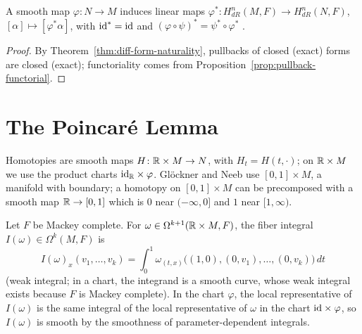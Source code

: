 \begin{proposition}[Functoriality]
  \label{prop:de-rham-functorial}
  \leanok
  A smooth map $\varphi \colon N \to M$ induces linear maps $\varphi^* \colon H^n_{dR}(M, F)
  \to H^n_{dR}(N, F)$, $[\alpha] \mapsto [\varphi^*\alpha]$, with $\mathrm{id}^* = \mathrm{id}$ and
  $(\varphi \circ \psi)^* = \psi^* \circ \varphi^*$ \cite[Section~3.6]{GN26}.
\end{proposition}

\begin{proof}
  \leanok
  By Theorem~\ref{thm:diff-form-naturality}, pullbacks of closed (exact) forms are closed
  (exact); functoriality comes from Proposition~\ref{prop:pullback-functorial}.
\end{proof}

\section{The Poincaré Lemma}

Homotopies are smooth maps $H \colon \mathbb{R} \times M \to N$, with $H_t = H(t, \cdot)$; on $\mathbb{R} \times M$
we use the product charts $\mathrm{id}_{\mathbb{R}} \times \varphi$. Glöckner and Neeb use $[0, 1] \times M$, a
manifold with boundary; a homotopy on $[0, 1] \times M$ can be precomposed with a smooth map
$\mathbb{R} \to [0, 1]$ which is $0$ near $(-\infty, 0]$ and $1$ near $[1, \infty)$.

\begin{definition}
  \label{def:fiber-integral}
  \leanok
  Let $F$ be Mackey complete. For $\omega \in \Omega^{k+1}(\mathbb{R} \times M, F)$, the fiber integral
  $I(\omega) \in \Omega^k(M, F)$ is
  \[
    I(\omega)_x(v_1, \dots, v_k) = \int_0^1 \omega_{(t, x)}\bigl((1, 0), (0, v_1), \dots,
    (0, v_k)\bigr)\, dt
  \]
  (weak integral; in a chart, the integrand is a smooth curve, whose weak integral exists because
  $F$ is Mackey complete). In the chart $\varphi$, the local representative of $I(\omega)$ is the
  same integral of the local representative of $\omega$ in the chart $\mathrm{id} \times \varphi$, so
  $I(\omega)$ is smooth by the smoothness of parameter-dependent integrals.
\end{definition}

